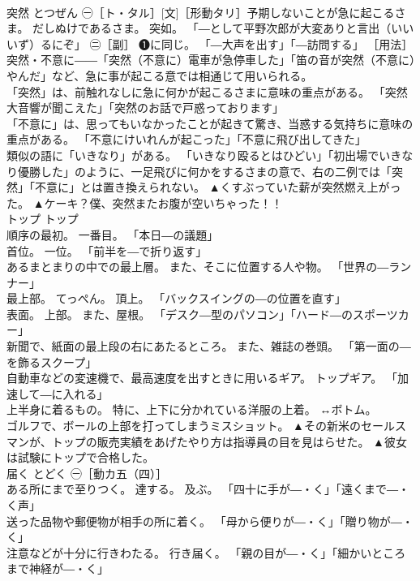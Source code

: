 \documentclass[8pt]{extreport}
\begin{document}
\begin{CJK}{UTF8}{min}
\\	突然	とつぜん	㊀［ト・タル］[文]［形動タリ］予期しないことが急に起こるさま。 だしぬけであるさま。 突如。 「―として平野次郎が大変ありと言出（いいいず）るにぞ」 ㊁［副］ ❶に同じ。 「―大声を出す」「―訪問する」 ［用法］突然・不意に――「突然（不意に）電車が急停車した」「笛の音が突然（不意に）やんだ」など、急に事が起こる意では相通じて用いられる。 
\\	「突然」は、前触れなしに急に何かが起こるさまに意味の重点がある。 「突然大音響が聞こえた」「突然のお話で戸惑っております」
\\	「不意に」は、思ってもいなかったことが起きて驚き、当惑する気持ちに意味の重点がある。 「不意にけいれんが起こった」「不意に飛び出してきた」
\\	類似の語に「いきなり」がある。 「いきなり殴るとはひどい」「初出場でいきなり優勝した」のように、一足飛びに何かをするさまの意で、右の二例では「突然」「不意に」とは置き換えられない。	▲くすぶっていた薪が突然燃え上がった。 ▲ケーキ？僕、突然またお腹が空いちゃった！！
\\	トップ	トップ	
\\	順序の最初。 一番目。 「本日―の議題」 
\\	首位。 一位。 「前半を―で折り返す」 
\\	あるまとまりの中での最上層。 また、そこに位置する人や物。 「世界の―ランナー」 
\\	最上部。 てっぺん。 頂上。 「バックスイングの―の位置を直す」 
\\	表面。 上部。 また、屋根。 「デスク―型のパソコン」「ハード―のスポーツカー」 
\\	新聞で、紙面の最上段の右にあたるところ。 また、雑誌の巻頭。 「第一面の―を飾るスクープ」 
\\	自動車などの変速機で、最高速度を出すときに用いるギア。 トップギア。 「加速して―に入れる」 
\\	上半身に着るもの。 特に、上下に分かれている洋服の上着。 ↔ボトム。 
\\	ゴルフで、ボールの上部を打ってしまうミスショット。	▲その新米のセールスマンが、トップの販売実績をあげたやり方は指導員の目を見はらせた。 ▲彼女は試験にトップで合格した。
\\	届く	とどく	㊀［動カ五（四）］ 
\\	ある所にまで至りつく。 達する。 及ぶ。 「四十に手が―・く」「遠くまで―・く声」 
\\	送った品物や郵便物が相手の所に着く。 「母から便りが―・く」「贈り物が―・く」 
\\	注意などが十分に行きわたる。 行き届く。 「親の目が―・く」「細かいところまで神経が―・く」 

\end{CJK}
\end{document}
